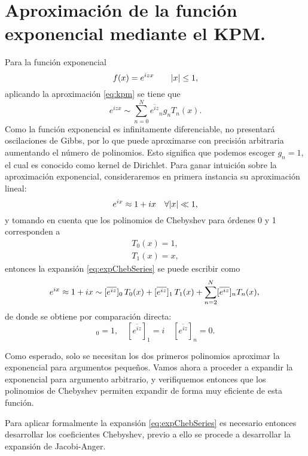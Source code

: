 \section[Aproximación de la función exponencial]{Aproximación de la función exponencial mediante el KPM.}

Para la función exponencial 
\begin{equation*}
	f(x) = e^{izx} \qquad \abs{x} \leq 1,
\end{equation*}
aplicando la aproximación \eqref{eq:kpm} se tiene que
\begin{equation}\label{eq:expChebSeries}
	e^{izx} \sim \sum_{n=0}^{N} \overline{e^{iz}}_n g_n T_n(x).
\end{equation}
Como la función exponencial es infinitamente diferenciable, no presentará oscilaciones de Gibbs, por lo que puede aproximarse con precisión arbitraria aumentando el número de polinomios. Esto significa que podemos escoger $g_n=1$, el cual es conocido como kernel de Dirichlet. Para ganar intuición sobre la aproximación exponencial, consideraremos en primera instancia su aproximación lineal:
\begin{equation*}
	e^{ix} \approx 1 + ix \quad \forall \abs{x} \ll 1,
\end{equation*}
y tomando en cuenta que los polinomios de Chebyshev para órdenes 0 y 1 corresponden a 
\begin{gather*}
	T_0(x) = 1,\\
	T_1(x) = x,
\end{gather*}
entonces la expansión \eqref{eq:expChebSeries} se puede escribir como
\begin{equation}
	e^{ix} \approx 1 + ix \sim 
	[\overline{e^{iz}}]_0\,T_0(x) + [\overline{e^{iz}}]_1\,T_1(x) + \sum_{n=2}^{N}  [\overline{e^{iz}}]_n  T_n(x), \\
\end{equation}
de donde se obtiene por comparación directa:
\begin{equation}
	[\overline{e^{iz}}]_0 =1,\quad [\overline{e^{iz}}]_1 = i\quad [\overline{e^{iz}}]_n =0.
\end{equation}

Como esperado, solo se necesitan los dos primeros polinomios aproximar la exponencial para argumentos pequeños. Vamos ahora a proceder a expandir la exponencial para argumento arbitrario, y verifiquemos entonces que los polinomios de Chebyshev permiten expandir de forma muy eficiente de esta función.

Para aplicar formalmente la expansión \eqref{eq:expChebSeries} es necesario entonces desarrollar los 
coeficientes Chebyshev, previo a ello se procede a desarrollar la expansión de Jacobi-Anger.

